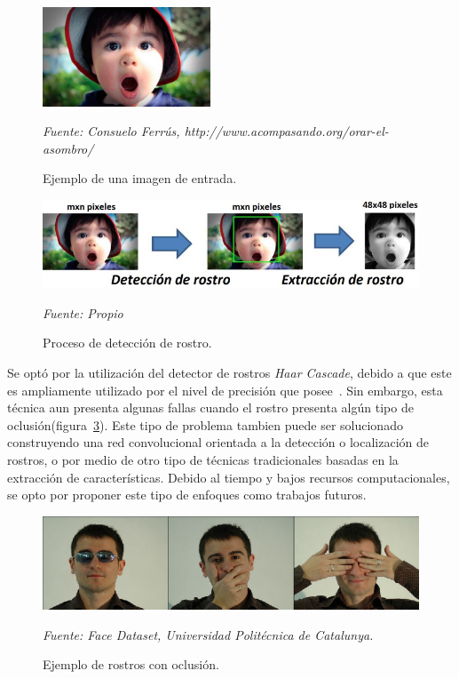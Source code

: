 \begin{figure}[H]
		\centering
		\includegraphics[width=50mm]{Imagenes/imagen_entrada.png}
		\caption{Ejemplo de una imagen de entrada.}
		\vspace{0.15cm}
		\textit{Fuente: Consuelo Ferrús, http://www.acompasando.org/orar-el-asombro/}
		\label{fig:imagen_entrada}
\end{figure}


\begin{figure}[H]
		\centering
		\includegraphics[width=140mm]{Imagenes/proceso_deteccion.png}
		\caption{Proceso de detección de rostro.}
		\vspace{0.15cm}
		\textit{Fuente: Propio}
		\label{fig:proceso_deteccion}
\end{figure}

Se optó por la utilización del detector de rostros \textit{Haar Cascade}, debido a que este es ampliamente utilizado por el nivel de precisión que posee~\cite{6russakovsky2015imagenet}. Sin embargo, esta técnica aun presenta algunas fallas cuando el rostro presenta algún tipo de oclusión(figura~\ref{fig:oclussion}). Este tipo de problema tambien puede ser solucionado construyendo una red convolucional orientada a la detección o localización de rostros, o por medio de otro tipo de técnicas tradicionales basadas en la extracción de características. Debido al tiempo y bajos recursos computacionales, se opto por proponer este tipo de enfoques como trabajos futuros.

\begin{figure}[H]
		\centering
		\includegraphics[width=130mm]{Imagenes/oclussion.jpeg}
		\caption{Ejemplo de rostros con oclusión.}
		\vspace{0.15cm}
		\textit{Fuente: Face Dataset, Universidad Politécnica de Catalunya.}
		\label{fig:oclussion}
\end{figure}

